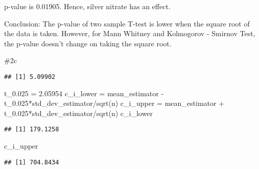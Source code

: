 \documentclass[
]{article}
\newenvironment{Shaded}{\begin{snugshade}}{\end{snugshade}}
\newcommand{\CommentTok}[1]{\textcolor[rgb]{0.56,0.35,0.01}{\textit{#1}}}
\newcommand{\DecValTok}[1]{\textcolor[rgb]{0.00,0.00,0.81}{#1}}
\newcommand{\FloatTok}[1]{\textcolor[rgb]{0.00,0.00,0.81}{#1}}
\newcommand{\FunctionTok}[1]{\textcolor[rgb]{0.00,0.00,0.00}{#1}}
\newcommand{\NormalTok}[1]{#1}
\newcommand{\OtherTok}[1]{\textcolor[rgb]{0.56,0.35,0.01}{#1}}
\newcommand{\SpecialCharTok}[1]{\textcolor[rgb]{0.00,0.00,0.00}{#1}}
\begin{document}
p-value is 0.01905. Hence, silver nitrate has an effect.

Conclusion: The p-value of two sample T-test is lower when the square
root of the data is taken. However, for Mann Whitney and Kolmogorov -
Smirnov Test, the p-value doesn't change on taking the square root.

\#2c

\begin{Shaded}
\end{Shaded}

\begin{verbatim}
## [1] 5.09902
\end{verbatim}

\begin{Shaded}
\begin{Highlighting}[]
\NormalTok{t\_0}\FloatTok{.025} \OtherTok{=} \FloatTok{2.05954} 
\NormalTok{c\_i\_lower }\OtherTok{=}\NormalTok{ mean\_estimator }\SpecialCharTok{{-}}\NormalTok{ t\_0}\FloatTok{.025}\SpecialCharTok{*}\NormalTok{std\_dev\_estimator}\SpecialCharTok{/}\FunctionTok{sqrt}\NormalTok{(n)}
\NormalTok{c\_i\_upper }\OtherTok{=}\NormalTok{ mean\_estimator }\SpecialCharTok{+}\NormalTok{ t\_0}\FloatTok{.025}\SpecialCharTok{*}\NormalTok{std\_dev\_estimator}\SpecialCharTok{/}\FunctionTok{sqrt}\NormalTok{(n)}
\NormalTok{c\_i\_lower}
\end{Highlighting}
\end{Shaded}

\begin{verbatim}
## [1] 179.1258
\end{verbatim}

\begin{Shaded}
\begin{Highlighting}[]
\NormalTok{c\_i\_upper}
\end{Highlighting}
\end{Shaded}

\begin{verbatim}
## [1] 704.8434
\end{verbatim}
\end{document}
